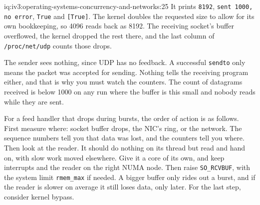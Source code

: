 \begin{solution}{iq:iv3:operating-systems-concurrency-and-networks:25}
It prints \texttt{8192}, \texttt{sent 1000, no error}, \texttt{True} and \texttt{[True]}. The kernel doubles the requested size to allow for its own bookkeeping, so 4096 reads back as 8192. The receiving socket's buffer overflowed, the kernel dropped the rest there, and the last column of \texttt{/proc/net/udp} counts those drops.

The sender sees nothing, since UDP has no feedback. A successful \texttt{sendto} only means the packet was accepted for sending. Nothing tells the receiving program either, and that is why you must watch the counters. The count of datagrams received is below 1000 on any run where the buffer is this small and nobody reads while they are sent.

For a feed handler that drops during bursts, the order of action is as follows. First measure where: socket buffer drops, the NIC's ring, or the network. The sequence numbers tell you that data was lost, and the counters tell you where. Then look at the reader. It should do nothing on its thread but read and hand on, with slow work moved elsewhere. Give it a core of its own, and keep interrupts and the reader on the right NUMA node. Then raise \texttt{SO\_RCVBUF}, with the system limit \texttt{rmem\_max} if needed. A bigger buffer only rides out a burst, and if the reader is slower on average it still loses data, only later. For the last step, consider kernel bypass.

\end{solution}

